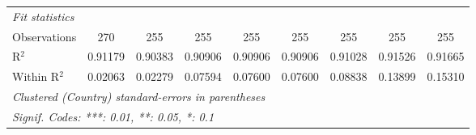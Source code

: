 \begin{table}[htbp]
\begin{tabular}{lcccccccc}
      \midrule
      \emph{Fit statistics}\\
      Observations                            & 270            & 255           & 255      & 255      & 255                    & 255                    & 255      & 255\\  
      R$^2$                                   & 0.91179        & 0.90383       & 0.90906  & 0.90906  & 0.90906                & 0.91028                & 0.91526  & 0.91665\\  
      Within R$^2$                            & 0.02063        & 0.02279       & 0.07594  & 0.07600  & 0.07600                & 0.08838                & 0.13899  & 0.15310\\  
      \midrule \midrule
      \multicolumn{9}{l}{\emph{Clustered (Country) standard-errors in parentheses}}\\
      \multicolumn{9}{l}{\emph{Signif. Codes: ***: 0.01, **: 0.05, *: 0.1}}\\
   \end{tabular}
\end{table}


